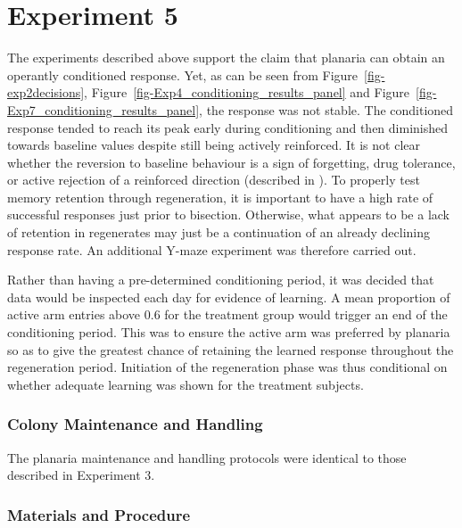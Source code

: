 \documentclass[
  jou,
  floatsintext,
  longtable,
  nolmodern,
  notxfonts,
  notimes,
  donotrepeattitle,
  colorlinks=true,linkcolor=blue,citecolor=blue,urlcolor=blue]{apa7}
\begin{document}
\section{Experiment 5}\label{sec-experiment-5}

The experiments described above support the claim that planaria can
obtain an operantly conditioned response. Yet, as can be seen from
Figure~\ref{fig-exp2decisions},
Figure~\ref{fig-Exp4_conditioning_results_panel} and
Figure~\ref{fig-Exp7_conditioning_results_panel}, the response was not
stable. The conditioned response tended to reach its peak early during
conditioning and then diminished towards baseline values despite still
being actively reinforced. It is not clear whether the reversion to
baseline behaviour is a sign of forgetting, drug tolerance, or active
rejection of a reinforced direction (described in
).
To properly test memory retention through regeneration, it is important
to have a high rate of successful responses just prior to bisection.
Otherwise, what appears to be a lack of retention in regenerates may
just be a continuation of an already declining response rate. An
additional Y-maze experiment was therefore carried out.

Rather than having a pre-determined conditioning period, it was decided
that data would be inspected each day for evidence of learning. A mean
proportion of active arm entries above 0.6 for the treatment group would
trigger an end of the conditioning period. This was to ensure the active
arm was preferred by planaria so as to give the greatest chance of
retaining the learned response throughout the regeneration period.
Initiation of the regeneration phase was thus conditional on whether
adequate learning was shown for the treatment subjects.

\subsubsection{Colony Maintenance and
Handling}\label{colony-maintenance-and-handling-4}

The planaria maintenance and handling protocols were identical to those
described in Experiment 3.

\subsubsection{Materials and Procedure}\label{materials-and-procedure-1}
\end{document}
